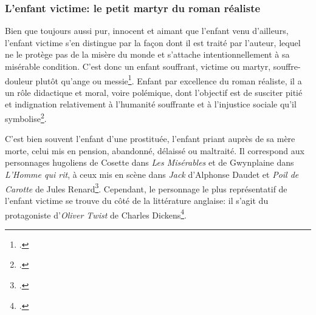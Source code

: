\subsubsection{L'enfant victime: le petit martyr du roman réaliste}
Bien que toujours aussi pur, innocent et aimant que l'enfant venu d'ailleurs, l'enfant victime s'en distingue par la façon dont il est traité par l'auteur, lequel ne le protège pas de la misère du monde et s'attache intentionnellement à sa misérable condition. C'est donc un enfant souffrant, victime ou martyr, souffre-douleur plutôt qu'ange ou messie\footcite[53]{Bethlenfalvay1979}.
Enfant par excellence du roman réaliste, il a un rôle didactique et moral, voire polémique, dont l'objectif est de susciter pitié et indignation relativement à l'humanité souffrante et à l'injustice sociale qu'il symbolise\footcite[53, 64, 85]{Bethlenfalvay1979}.
\par
C'est bien souvent l'enfant d'une prostituée, l'enfant priant auprès de sa mère morte, celui mis en pension, abandonné, délaissé ou maltraité. Il correspond aux personnages hugoliens de Cosette dans \textit{Les Misérables} et de Gwynplaine dans \textit{L'Homme qui rit}, à ceux mis en scène dans \textit{Jack} d'Alphonse Daudet et \textit{Poil de Carotte} de Jules Renard\footcite[56, 71, 76-77]{Bethlenfalvay1979}.
Cependant, le personnage le plus représentatif de l'enfant victime se trouve du côté de la littérature anglaise: il s'agit du protagoniste d'\textit{Oliver Twist} de Charles Dickens\footcite[110]{Bethlenfalvay1979}.

